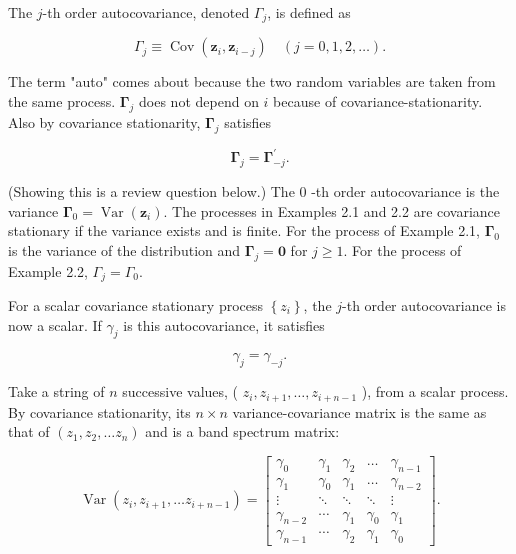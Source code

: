 \documentclass[10pt]{article}
\begin{document}
The $j$-th order autocovariance, denoted $\Gamma_{j}$, is defined as

$$
\Gamma_{j} \equiv \operatorname{Cov}\left(\mathbf{z}_{i}, \mathbf{z}_{i-j}\right) \quad(j=0,1,2, \ldots) .
$$

The term "auto" comes about because the two random variables are taken from the same process. $\boldsymbol{\Gamma}_{j}$ does not depend on $i$ because of covariance-stationarity. Also by covariance stationarity, $\boldsymbol{\Gamma}_{j}$ satisfies


\begin{equation*}
\boldsymbol{\Gamma}_{j}=\boldsymbol{\Gamma}_{-j}^{\prime} . \tag{2.2.1}
\end{equation*}


(Showing this is a review question below.) The 0 -th order autocovariance is the variance $\boldsymbol{\Gamma}_{0}=\operatorname{Var}\left(\mathbf{z}_{i}\right)$. The processes in Examples 2.1 and 2.2 are covariance stationary if the variance exists and is finite. For the process of Example 2.1, $\boldsymbol{\Gamma}_{0}$ is the variance of the distribution and $\boldsymbol{\Gamma}_{j}=\mathbf{0}$ for $j \geq 1$. For the process of Example 2.2, $\Gamma_{j}=\Gamma_{0}$.

For a scalar covariance stationary process $\left\{z_{i}\right\}$, the $j$-th order autocovariance is now a scalar. If $\gamma_{j}$ is this autocovariance, it satisfies


\begin{equation*}
\gamma_{j}=\gamma_{-j} . \tag{2.2.2}
\end{equation*}


Take a string of $n$ successive values, ( $z_{i}, z_{i+1}, \ldots, z_{i+n-1}$ ), from a scalar process. By covariance stationarity, its $n \times n$ variance-covariance matrix is the same as that of $\left(z_{1}, z_{2}, \ldots z_{n}\right)$ and is a band spectrum matrix:

$$
\operatorname{Var}\left(z_{i}, z_{i+1}, \ldots z_{i+n-1}\right)=\left[\begin{array}{ccccc}
\gamma_{0} & \gamma_{1} & \gamma_{2} & \ldots & \gamma_{n-1} \\
\gamma_{1} & \gamma_{0} & \gamma_{1} & \ldots & \gamma_{n-2} \\
\vdots & \ddots & \ddots & \ddots & \vdots \\
\gamma_{n-2} & \cdots & \gamma_{1} & \gamma_{0} & \gamma_{1} \\
\gamma_{n-1} & \cdots & \gamma_{2} & \gamma_{1} & \gamma_{0}
\end{array}\right] .
$$
\end{document}
